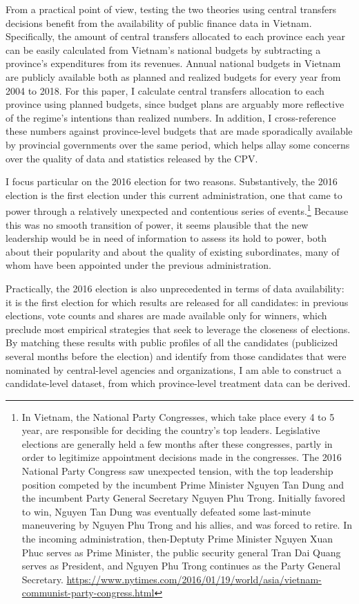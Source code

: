 \documentclass[12pt]{article}
\newcommand{\1}{\mathbbm{1}}
\begin{document}
From a practical point of view, testing the two theories using central transfers decisions benefit from the availability of public finance data in Vietnam. Specifically, the amount of central transfers allocated to each province each year can be easily calculated from Vietnam's national budgets by subtracting a province's expenditures from its revenues. Annual national budgets in Vietnam are publicly available both as planned and realized budgets for every year from 2004 to 2018. For this paper, I calculate central transfers allocation to each province using planned budgets, since budget plans are arguably more reflective of the regime's intentions than realized numbers. In addition, I cross-reference these numbers against province-level budgets that are made sporadically available by provincial governments over the same period, which helps allay some concerns over the quality of data and statistics released by the CPV.

I focus particular on the 2016 election for two reasons. Substantively, the 2016 election is the first election under this current administration, one that came to power through a relatively unexpected and contentious series of events.\footnote{In Vietnam, the National Party Congresses, which take place every 4 to 5 year, are responsible for deciding the country's top leaders. Legislative elections are generally held a few months after these congresses, partly in order to legitimize appointment decisions made in the congresses. The 2016 National Party Congress saw unexpected tension, with the top leadership position competed by the incumbent Prime Minister Nguyen Tan Dung and the incumbent Party General Secretary Nguyen Phu Trong. Initially favored to win, Nguyen Tan Dung was eventually defeated some last-minute maneuvering by Nguyen Phu Trong and his allies, and was forced to retire. In the incoming administration, then-Deptuty Prime Minister Nguyen Xuan Phuc serves as Prime Minister, the public security general Tran Dai Quang serves as President, and Nguyen Phu Trong continues as the Party General Secretary. \url{https://www.nytimes.com/2016/01/19/world/asia/vietnam-communist-party-congress.html}} Because this was no smooth transition of power, it seems plausible that the new leadership would be in need of information to assess its hold to power, both about their popularity and about the quality of existing subordinates, many of whom have been appointed under the previous administration. 

Practically, the 2016 election is also unprecedented in terms of data availability: it is the first election for which results are released for all candidates: in previous elections, vote counts and shares are made available only for winners, which preclude most empirical strategies that seek to leverage the closeness of elections. By matching these results with public profiles of all the candidates (publicized several months before the election) and identify from those candidates that were nominated by central-level agencies and organizations, I am able to construct a candidate-level dataset, from which province-level treatment data can be derived.
\end{document}
